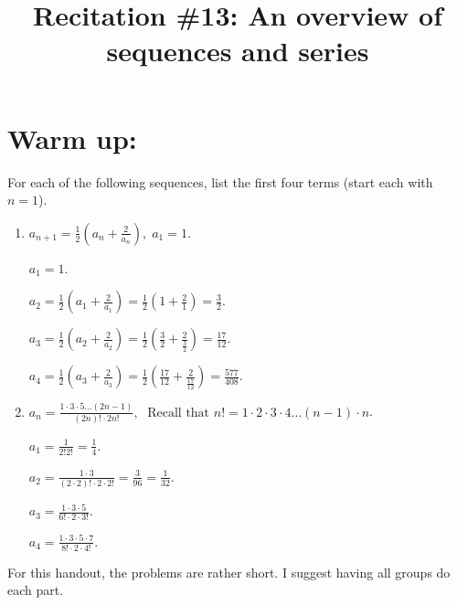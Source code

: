 \documentclass[noinstructornotes]{ximera}
\title{Recitation \#13: An overview of sequences and series}
\begin{document}
\begin{abstract}		\end{abstract}
\maketitle




\section{Warm up:}

	For each of the following sequences, list the first four terms (start each with $n=1$).
	\begin{enumerate}
	\item 	$a_{n+1} = \frac{1}{2} \left( a_n + \frac{2}{a_n} \right), \; a_1 = 1$.
	\begin{freeResponse}
	  \; $a_1 = 1$.
	
	  \; $a_2 = \frac{1}{2} \left( a_1 + \frac{2}{a_1} \right) = \frac{1}{2} \left( 1 + \frac{2}{1} \right) = \frac{3}{2}$.
	
	  \; $a_3 = \frac{1}{2} \left( a_2 + \frac{2}{a_2} \right) = \frac{1}{2} \left( \frac{3}{2} + \frac{2}{\frac{3}{2}} \right) = \frac{17}{12}$.
	
	  \; $a_4 = \frac{1}{2} \left( a_3 + \frac{2}{a_3} \right) = \frac{1}{2} \left( \frac{17}{12} + \frac{2}{\frac{17}{12}} \right) = \frac{577}{408}.$
	\end{freeResponse}
	
	
	
	\item 	$a_n = \frac{1 \cdot 3 \cdot 5 \hdots (2n-1)}{(2n)! \cdot 2n!}, \; \text{ Recall that }n! = 1 \cdot 2 \cdot 3 \cdot 4 \hdots (n-1) \cdot n$.
	\begin{freeResponse}
	  \; $a_1 = \frac{1}{2! 2!} = \frac{1}{4}$.
	
	  \; $a_2 = \frac{1 \cdot 3}{(2 \cdot 2)! \cdot 2 \cdot 2!} = \frac{3}{96} = \frac{1}{32}$.
	
	  \; $a_3 = \frac{1 \cdot 3 \cdot 5}{6! \cdot 2 \cdot 3!}$.
	
	  \; $a_4 = \frac{1 \cdot 3 \cdot 5 \cdot 7}{8! \cdot 2 \cdot 4!}$.
	\end{freeResponse}
	\end{enumerate}
	
\begin{instructorNotes}
For this handout, the problems are rather short. I suggest having all groups do each part.
\end{instructorNotes}
\end{document}
